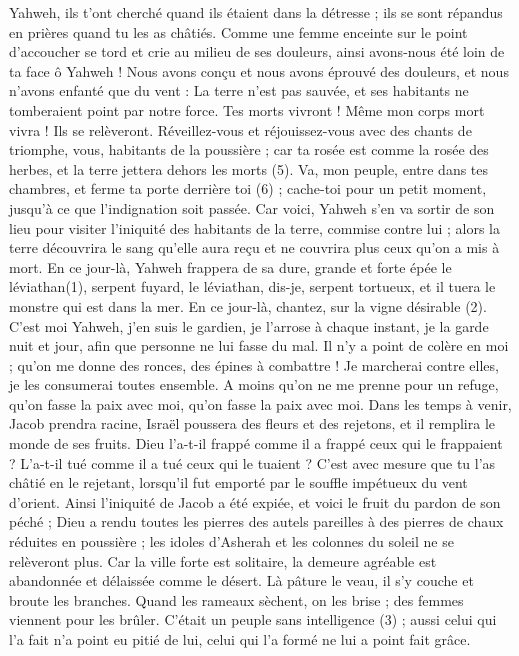 \begin{multicols}{2}
{Yahweh, ils t’ont cherché quand ils étaient dans la détresse ; ils se sont répandus en prières quand tu les as châtiés.
Comme une femme enceinte sur le point d’accoucher se tord et crie au milieu de ses douleurs, ainsi avons-nous été loin de ta face ô Yahweh !
Nous avons conçu et nous avons éprouvé des douleurs, et nous n’avons enfanté que du vent : La terre n’est pas sauvée, et ses habitants ne tomberaient point par notre force.
Tes morts vivront ! Même mon corps mort vivra ! Ils se relèveront. Réveillez-vous et réjouissez-vous avec des chants de triomphe, vous, habitants de la poussière ; car ta rosée est comme la rosée des herbes, et la terre jettera dehors les morts (5).
Va, mon peuple, entre dans tes chambres, et ferme ta porte derrière toi (6) ; cache-toi pour un petit moment, jusqu’à ce que l'indignation soit passée.
Car voici, Yahweh s'en va sortir de son lieu pour visiter l'iniquité des habitants de la terre, commise contre lui ; alors la terre découvrira le sang qu'elle aura reçu et ne couvrira plus ceux qu'on a mis à mort.
\VerseOne{}En ce jour-là, Yahweh frappera de sa dure, grande et forte épée le léviathan(1), serpent fuyard, le léviathan, dis-je, serpent tortueux, et il tuera le monstre qui est dans la mer.
En ce jour-là, chantez, sur la vigne désirable (2).
C'est moi Yahweh, j’en suis le gardien, je l'arrose à chaque instant, je la garde nuit et jour, afin que personne ne lui fasse du mal.
Il n'y a point de colère en moi ; qu'on me donne des ronces, des épines à combattre ! Je marcherai contre elles, je les consumerai toutes ensemble.
A moins qu’on ne me prenne pour un refuge, qu’on fasse la paix avec moi, qu’on fasse la paix avec moi.
Dans les temps à venir, Jacob prendra racine, Israël poussera des fleurs et des rejetons, et il remplira le monde de ses fruits.
Dieu l’a-t-il frappé comme il a frappé ceux qui le frappaient ? L’a-t-il tué comme il a tué ceux qui le tuaient ?
C’est avec mesure que tu l’as châtié en le rejetant, lorsqu’il fut emporté par le souffle impétueux du vent d’orient.
Ainsi l’iniquité de Jacob a été expiée, et voici le fruit du pardon de son péché ; Dieu a rendu toutes les pierres des autels pareilles à des pierres de chaux réduites en poussière ; les idoles d’Asherah et les colonnes du soleil ne se relèveront plus.
Car la ville forte est solitaire, la demeure agréable est abandonnée et délaissée comme le désert. Là pâture le veau, il s’y couche et broute les branches.
Quand les rameaux sèchent, on les brise ; des femmes viennent pour les brûler. C’était un peuple sans intelligence (3) ; aussi celui qui l’a fait n’a point eu pitié de lui, celui qui l’a formé ne lui a point fait grâce.
}
\end{multicols}
